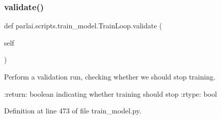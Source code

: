 \subsubsection{\texorpdfstring{validate()}{validate()}}
{\footnotesize\ttfamily def parlai.\+scripts.\+train\+\_\+model.\+Train\+Loop.\+validate (\begin{DoxyParamCaption}\item[{}]{self }\end{DoxyParamCaption})}

\begin{DoxyVerb}Perform a validation run, checking whether we should stop training.

:return: boolean indicating whether training should stop
:rtype: bool
\end{DoxyVerb}
 

Definition at line 473 of file train\+\_\+model.\+py.



